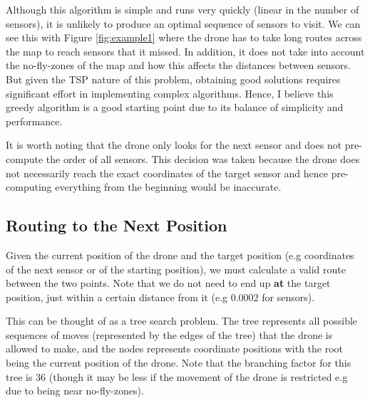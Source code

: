 \documentclass[11pt]{article}
\begin{document}
Although this algorithm is simple and runs very quickly (linear in the number of sensors), it is unlikely to produce an optimal sequence of sensors to visit. We can see this with Figure \ref{fig:example1} where the drone has to take long routes across the map to reach sensors that it missed. In addition, it does not take into account the no-fly-zones of the map and how this affects the distances between sensors. But given the TSP nature of this problem, obtaining good solutions requires significant effort in implementing complex algorithms. Hence, I believe this greedy algorithm is a good starting point due to its balance of simplicity and performance.

It is worth noting that the drone only looks for the next sensor and does not pre-compute the order of all sensors. This decision was taken because the drone does not necessarily reach the exact coordinates of the target sensor and hence pre-computing everything from the beginning would be inaccurate.

\subsection{Routing to the Next Position}
Given the current position of the drone and the target position (e.g coordinates of the next sensor or of the starting position), we must calculate a valid route between the two points. Note that we do not need to end up \textbf{at} the target position, just within a certain distance from it (e.g 0.0002 for sensors).

This can be thought of as a tree search problem. The tree represents all possible sequences of moves (represented by the edges of the tree) that the drone is allowed to make, and the nodes represents coordinate positions with the root being the current position of the drone. Note that the branching factor for this tree is 36 (though it may be less if the movement of the drone is restricted e.g due to being near no-fly-zones).
\end{document}
